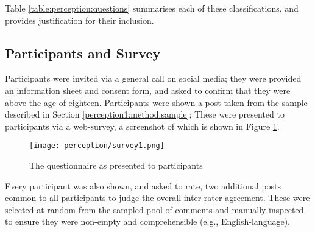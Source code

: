 Table \ref{table:perception:questions} summarises each of these classifications, and provides justification for their inclusion.

\subsection{Participants and Survey}
Participants were invited via a general call on social media; they were provided an information sheet and consent form, and asked to confirm that they were above the age of eighteen. 
Participants were shown a post taken from the sample described in Section \ref{perception1:method:sample};
These were presented to participants via a web-survey, a screenshot of which is shown in Figure \ref{figure:perception:survey}.

\begin{figure}
\centering
\texttt{[image: perception/survey1.png]}
\caption{The questionnaire as presented to participants}
\label{figure:perception:survey}
\end{figure}


Every participant was also shown, and asked to rate, two additional posts common to all participants to judge the overall inter-rater agreement. These were selected at random from the sampled pool of comments and manually inspected to ensure they were non-empty and comprehensible (e.g., English-language).


